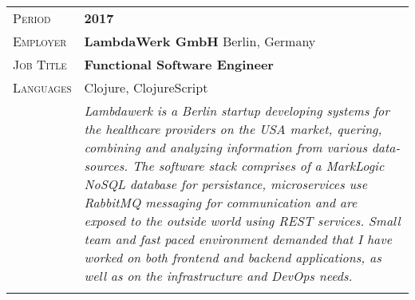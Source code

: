 \documentclass[a4paper, oneside, final]{scrartcl}
\newcommand{\gray}{\rowcolor[gray]{.90}}
\begin{document}
\begin{center}
\begin{tabularx}{0.97\linewidth}{>{\raggedleft\scshape}p{2cm}X}
\gray Period    & \textbf{2017}\\
\gray Employer  & \textbf{LambdaWerk GmbH} \hfill Berlin, Germany\\
\gray Job Title & \textbf{Functional Software Engineer}\\
\gray Languages & Clojure, ClojureScript\\
\gray           &  {\textit{Lambdawerk is a Berlin startup developing systems for the healthcare providers on the USA market, quering, combining and analyzing information from various data-sources.
The software stack comprises of a MarkLogic NoSQL database for persistance, microservices use RabbitMQ messaging for communication and are exposed to the outside world using REST services.
Small team and fast paced environment demanded that I have worked on both frontend and backend applications, as well as on the infrastructure and DevOps needs.
}}\\ \\


\end{tabularx}
\end{center}
\end{document}
